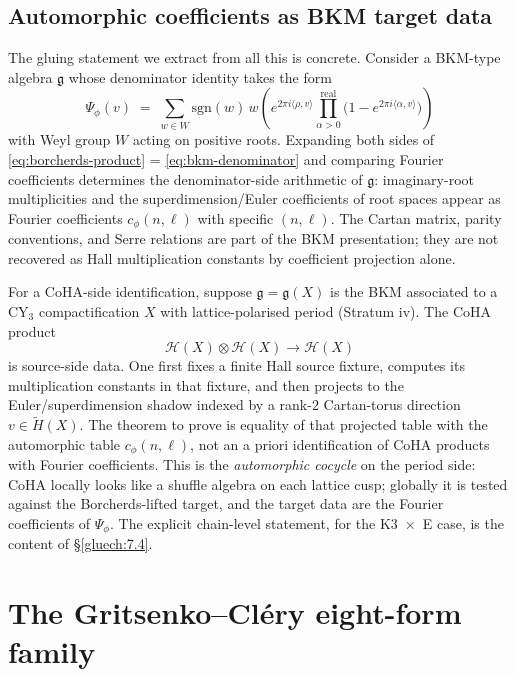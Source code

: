 \subsection{Automorphic coefficients as BKM target data}

The gluing statement we extract from all this is concrete. Consider a BKM-type algebra $\mathfrak g$ whose denominator identity takes the form
\begin{equation}
  \Psi_\phi(v) \;=\; \sum_{w \in W} \mathrm{sgn}(w) \, w\!\left(e^{2\pi i \langle \rho, v\rangle} \prod_{\alpha > 0}^{\mathrm{real}} \bigl(1 - e^{2\pi i \langle \alpha, v\rangle}\bigr)\right)
  \label{eq:bkm-denominator}
\end{equation}
with Weyl group $W$ acting on positive roots. Expanding both sides of \eqref{eq:borcherds-product} = \eqref{eq:bkm-denominator} and comparing Fourier coefficients determines the denominator-side arithmetic of $\mathfrak g$: imaginary-root multiplicities and the superdimension/Euler coefficients of root spaces appear as Fourier coefficients $c_\phi(n, \ell)$ with specific $(n, \ell)$. The Cartan matrix, parity conventions, and Serre relations are part of the BKM presentation; they are not recovered as Hall multiplication constants by coefficient projection alone.

For a CoHA-side identification, suppose $\mathfrak g = \mathfrak g(X)$ is the BKM associated to a CY$_3$ compactification $X$ with lattice-polarised period (Stratum iv). The CoHA product
\[
  \mathcal H(X) \otimes \mathcal H(X) \longrightarrow \mathcal H(X)
\]
is source-side data. One first fixes a finite Hall source fixture, computes its multiplication constants in that fixture, and then projects to the Euler/superdimension shadow indexed by a rank-$2$ Cartan-torus direction $v \in \widetilde H(X)$. The theorem to prove is equality of that projected table with the automorphic table $c_\phi(n, \ell)$, not an a priori identification of CoHA products with Fourier coefficients. This is the \emph{automorphic cocycle} on the period side: CoHA locally looks like a shuffle algebra on each lattice cusp; globally it is tested against the Borcherds-lifted target, and the target data are the Fourier coefficients of $\Psi_\phi$. The explicit chain-level statement, for the K3~$\times$~E case, is the content of \S\ref{gluech:7.4}.

\section{The Gritsenko--Cl\'ery eight-form family}
\label{gluech:7.3}

